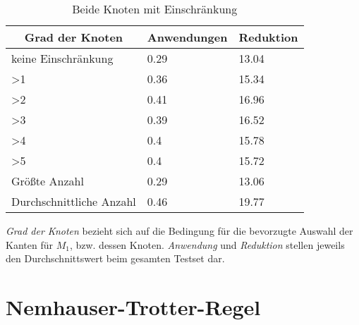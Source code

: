 \begin{table}[htb]
\caption{Beide Knoten mit Einschränkung\label{tab:degreeAND}}
\vspace*{1em}
\centering

\bgroup
\def\arraystretch{1.3}%

\begin{threeparttable}

\begin{tabular}[c]{l|l|l}
	
	\multicolumn{1}{c|}{\textbf{Grad der Knoten}} & 
	\multicolumn{1}{c|}{\textbf{Anwendungen}} & 
	\multicolumn{1}{c}{\textbf{Reduktion}} \\ 
	
	\hline

	keine Einschränkung&0.29&13.04\\
	>1&0.36 &15.34 \\
	>2&0.41 &16.96 \\
	>3& 0.39& 16.52 \\
	>4& 0.4 &15.78 \\
	>5& 0.4 & 15.72\\
	Größte Anzahl& 0.29 &13.06 \\
	Durchschnittliche Anzahl& 0.46&19.77 \\
	
\end{tabular}
\begin{tablenotes}\footnotesize
\item \emph{Grad der Knoten} bezieht sich auf die Bedingung für die bevorzugte Auswahl der Kanten für $M_{1}$, bzw. dessen Knoten. \emph{Anwendung} und \emph{Reduktion} stellen jeweils den Durchschnittswert beim gesamten Testset dar.
\end{tablenotes}

\end{threeparttable}

\egroup

\end{table}

\section{Nemhauser-Trotter-Regel}
\label{ch:Implementierung:sec:Trott}

